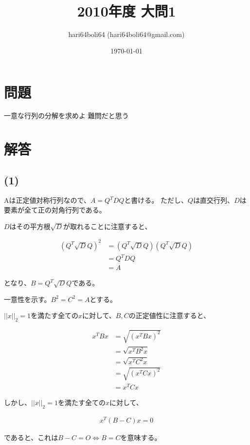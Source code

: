 \documentclass[a4paper, 10pt, dvipdfmx]{jlreq}
\begin{document}
\title{2010年度 大問1}
\author{hari64boli64 (hari64boli64@gmail.com)}
\date{\today}
\maketitle

\section{問題}

一意な行列の分解を求めよ 難問だと思う

\section{解答}

\subsection*{(1)}

Aは正定値対称行列なので、$A=Q^TDQ$と書ける。
ただし、$Q$は直交行列、$D$は要素が全て正の対角行列である。

$D$はその平方根$\sqrt{D}$が取れることに注意すると、

\begin{align*}
  (Q^T\sqrt{D}Q)^2 & =(Q^T\sqrt{D}Q)(Q^T\sqrt{D}Q) \\
                   & =Q^TDQ                        \\
                   & =A
\end{align*}

となり、$B=Q^T\sqrt{D}Q$である。

一意性を示す。$B^2=C^2=A$とする。

$||x||_2=1$を満たす全ての$x$に対して、$B,C$の正定値性に注意すると、

\begin{align*}
  x^TBx & =\sqrt{(x^TBx)^2} \\
        & =\sqrt{x^TB^2x}   \\
        & =\sqrt{x^TC^2x}   \\
        & =\sqrt{(x^TCx)^2} \\
        & =x^TCx
\end{align*}

しかし、$||x||_2=1$を満たす全ての$x$に対して、

\begin{align*}
  x^T(B-C)x =0
\end{align*}

であると、これは$B-C=O \Leftrightarrow B=C$を意味する。
\end{document}
